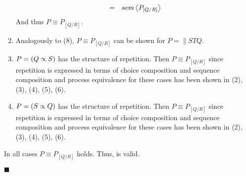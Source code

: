 \begin{myproof}
\begin{enumerate}
\begin{eqnarray*}
              & = & sem \left\langle P_{\left[ Q / R \right]} \right\rangle
    \end{eqnarray*}
    And thus $P \equiv P_{\left[ Q / R \right]}$.
  \item Analogously to (8), $P \equiv P_{\left[ Q / R \right]}$ can be shown for $P = \parallel{S}{T}{Q}$.
  \item $P = \left( Q \propto S \right)$ has the structure of repetition. Then $P \equiv P_{\left[ Q / R \right]}$ since repetition is expressed in terms of choice composition and sequence composition and process equivalence for these cases has been shown in (2), (3), (4), (5), (6).
  \item $P = \left( S \propto Q \right)$ has the structure of repetition. Then $P \equiv P_{\left[ Q / R \right]}$ since repetition is expressed in terms of choice composition and sequence composition and process equivalence for these cases has been shown in (2), (3), (4), (5), (6).
\end{enumerate}
In all cases $P \equiv P_{\left[ Q / R \right]}$ holds. Thus,  is valid.

\hfill$\blacksquare$
\end{myproof}
